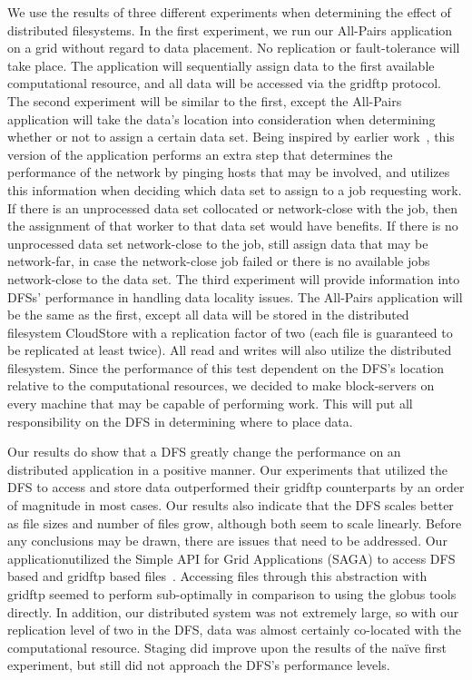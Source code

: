 \documentclass[a4paper,11pt]{article}
\begin{document}
We use the results of three different experiments when determining the effect of distributed filesystems. In the first experiment, we run our All-Pairs application on a grid without regard to data placement. No replication or fault-tolerance will take place. The application will sequentially assign data to the first available computational resource, and all data will be accessed via the gridftp protocol. The second experiment will be similar to the first, except the All-Pairs application will take the data's location into consideration when determining whether or not to assign a certain data set. Being inspired by earlier work~\cite{netperf}, this version of the application performs an extra step that determines the performance of the network by pinging hosts that may be involved, and utilizes this information when deciding which data set to assign to a job requesting work. If there is an unprocessed data set collocated or network-close with the job, then the assignment of that worker to that data set would have benefits. If there is no unprocessed data set network-close to the job, still assign data that may be network-far, in case the network-close job failed or there is no available jobs network-close to the data set. The third experiment will provide information into DFSs' performance in handling data locality issues. The All-Pairs application will be the same as the first, except all data will be stored in the distributed filesystem CloudStore with a replication factor of two (each file is guaranteed to be replicated at least twice). All read and writes will also utilize the distributed filesystem. Since the performance of this test dependent on the DFS's location relative to the computational resources, we decided to make block-servers on every machine that may be capable of performing work. This will put all responsibility on the DFS in determining where to place data.

Our results do show that a DFS greatly change the performance on an distributed application in a positive manner. Our experiments that utilized the DFS to access and store data outperformed their gridftp counterparts by an order of magnitude in most cases. Our results also indicate that the DFS scales better as file sizes and number of files grow, although both seem to scale linearly. Before any conclusions may be drawn, there are issues that need to be addressed. Our applicationutilized the Simple API for Grid Applications (SAGA) to access DFS based and gridftp based files~\cite{saga_web}. Accessing files through this abstraction with gridftp seemed to perform sub-optimally in comparison to using the globus tools directly. In addition, our distributed system was not extremely large, so with our replication level of two in the DFS, data was almost certainly co-located with the computational resource. Staging did improve upon the results of the naïve first experiment, but still did not approach the DFS's performance levels. 
\end{document}
